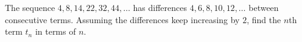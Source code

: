 The sequence $4,8,14,22,32,44,\dots$ has differences $4,6,8,10,12,\dots$ between consecutive terms. Assuming the differences keep increasing by $2$, find the $n$th term $t_n$ in terms of $n$.
